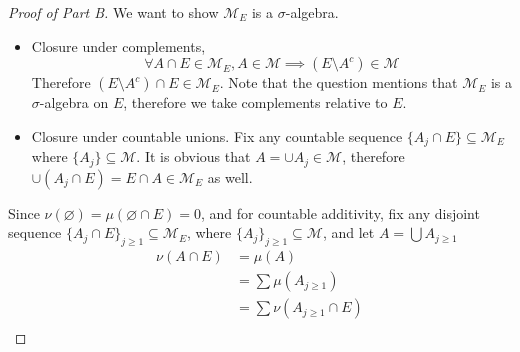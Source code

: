\documentclass[../../main.tex]{subfiles}
\begin{document}
\begin{proof}[Proof of Part B]
    We want to show $\mathcal{M}_E$ is a $\sigma$-algebra.
    \begin{itemize}
        \item Closure under complements,
        \[
        \forall A\cap E\in\mathcal{M}_E, A\in\mathcal{M}\implies (E\setminus A^c)\in\mathcal{M}
        \]
        Therefore $(E\setminus A^c)\cap E\in\mathcal{M}_E$. Note that the question mentions that $\mathcal{M}_E$ is a $\sigma$-algebra on $E$, therefore we take complements relative to $E$.
        \item Closure under countable unions. Fix any countable sequence $\{A_j\cap E\}\subseteq\mathcal{M}_E$ where $\{A_j\}\subseteq \mathcal{M}$. It is obvious that $A=\cup A_j\in\mathcal{M}$, therefore $\cup (A_j\cap E)=E\cap A\in\mathcal{M}_E$ as well.
    \end{itemize}
    Since $\nu(\varnothing)=\mu(\varnothing\cap E)=0$, and for countable additivity, fix any disjoint sequence $\{A_j\cap E\}_{j\geq 1}\subseteq \mathcal{M}_E$, where $\{A_j\}_{j\geq 1}\subseteq\mathcal{M}$, and let $A=\bigcup A_{j\geq 1}$
    \begin{align*}
        \nu(A\cap E)&=\mu(A)\\
        &=\sum \mu(A_{j\geq 1})\\
        &=\sum \nu(A_{j\geq 1}\cap E)\\
    \end{align*}
\end{proof}
\end{document}

